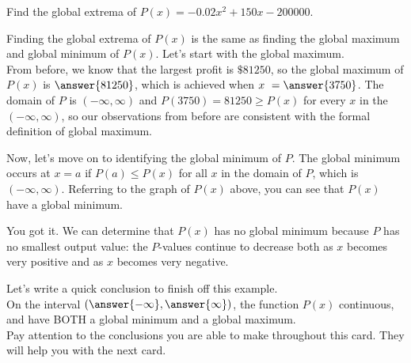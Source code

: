 \documentclass{ximera}
\begin{document}
\begin{example}
Find the global extrema of $P(x) = -0.02x^2 + 150x-200000$.
\begin{explanation}
Finding the global extrema of $P(x)$ is the same as finding the global maximum and global minimum of $P(x)$.  Let's start with the global maximum.  \\

From before, we know that the largest profit is $\$81250$, so the global maximum of $P(x)$ is $\answer{81250}$, which is achieved when $x \ = \answer{3750}$.  The domain of $P$ is $(-\infty, \infty)$ and $P(3750) = 81250 \geq P(x)$ for every $x$ in the $(-\infty, \infty)$, so our observations from before are consistent with the formal definition of global maximum. \\

\begin{explanation}

Now, let's move on to identifying the global minimum of $P$.  The global minimum occurs at $x=a$ if $P(a) \leq P(x)$ for all $x$ in the domain of $P$, which is $(-\infty, \infty)$.  Referring to the graph of $P(x)$ above, you can see that $P(x)$  have a global minimum. 

\begin{feedback}[correct]
You got it.  We can determine that $P(x)$ has no global minimum because $P$ has no smallest output value: the $P$-values continue to decrease both as $x$ becomes very positive and as $x$ becomes very negative. 
\end{feedback}

\begin{explanation}

Let's write a quick conclusion to finish off this example. \\

On the  interval $\left( \answer{-\infty}, \answer{\infty} \right)$, the function $P(x)$  continuous, and  have BOTH a global minimum and a global maximum.  \\

Pay attention to the conclusions you are able to make throughout this card.  They will help you with the next card. 

\end{explanation}

\end{explanation}

\end{explanation}

\end{example}
\end{document}
